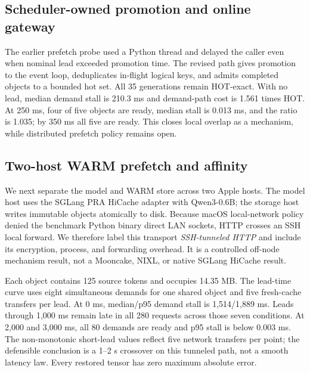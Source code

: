 \documentclass[10pt]{article}
\begin{document}
\subsection{Scheduler-owned promotion and online gateway}
The earlier prefetch probe used a Python thread and delayed the caller even
when nominal lead exceeded promotion time. The revised path gives promotion to
the event loop, deduplicates in-flight logical keys, and admits completed
objects to a bounded hot set. All 35 generations remain HOT-exact. With no
lead, median demand stall is 210.3 ms and demand-path cost is 1.561 times HOT.
At 250 ms, four of five objects are ready, median stall is 0.013 ms, and the
ratio is 1.035; by 350 ms all five are ready. This closes local overlap as a
mechanism, while distributed prefetch policy remains open.

\begin{table}[!htbp]
\centering
\scriptsize
\caption{Event-loop-owned WARM promotion. Lead and stall are milliseconds.}
\resizebox{\linewidth}{!}{%
}
\label{tab:sglang-async-warm}
\end{table}

\subsection{Two-host WARM prefetch and affinity}

We next separate the model and WARM store across two Apple hosts. The model host
uses the SGLang PRA HiCache adapter with Qwen3-0.6B; the storage host writes
immutable objects atomically to disk. Because macOS local-network policy denied
the benchmark Python binary direct LAN sockets, HTTP crosses an SSH local
forward. We therefore label this transport \emph{SSH-tunneled HTTP} and include
its encryption, process, and forwarding overhead. It is a controlled off-node
mechanism result, not a Mooncake, NIXL, or native SGLang HiCache result.

Each object contains 125 source tokens and occupies 14.35 MB. The lead-time
curve uses eight simultaneous demands for one shared object and five fresh-cache
transfers per lead. At 0 ms, median/p95 demand stall is 1,514/1,889 ms. Leads
through 1,000 ms remain late in all 280 requests across those seven conditions.
At 2,000 and 3,000 ms, all 80 demands are ready and p95 stall is below 0.003 ms.
The non-monotonic short-lead values reflect five network transfers per point;
the defensible conclusion is a 1--2 s crossover on this tunneled path, not a
smooth latency law. Every restored tensor has zero maximum absolute error.
\end{document}
